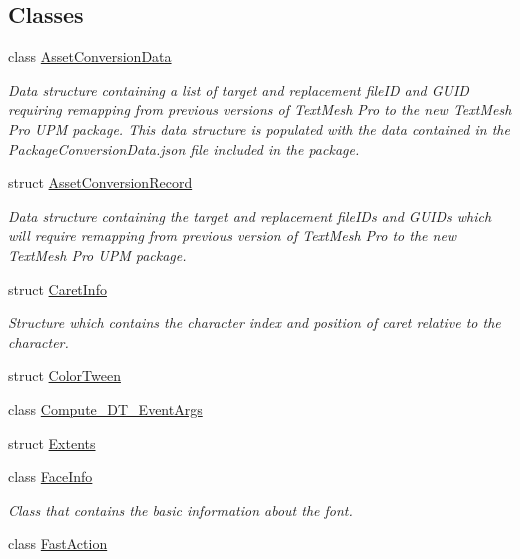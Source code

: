 \subsection*{Classes}
\begin{DoxyCompactItemize}
\item 
class \mbox{\hyperlink{class_t_m_pro_1_1_asset_conversion_data}{Asset\+Conversion\+Data}}
\begin{DoxyCompactList}\small\item\em Data structure containing a list of target and replacement file\+ID and G\+U\+ID requiring remapping from previous versions of Text\+Mesh Pro to the new Text\+Mesh Pro U\+PM package. This data structure is populated with the data contained in the Package\+Conversion\+Data.\+json file included in the package. \end{DoxyCompactList}\item 
struct \mbox{\hyperlink{struct_t_m_pro_1_1_asset_conversion_record}{Asset\+Conversion\+Record}}
\begin{DoxyCompactList}\small\item\em Data structure containing the target and replacement file\+I\+Ds and G\+U\+I\+Ds which will require remapping from previous version of Text\+Mesh Pro to the new Text\+Mesh Pro U\+PM package. \end{DoxyCompactList}\item 
struct \mbox{\hyperlink{struct_t_m_pro_1_1_caret_info}{Caret\+Info}}
\begin{DoxyCompactList}\small\item\em Structure which contains the character index and position of caret relative to the character. \end{DoxyCompactList}\item 
struct \mbox{\hyperlink{struct_t_m_pro_1_1_color_tween}{Color\+Tween}}
\item 
class \mbox{\hyperlink{class_t_m_pro_1_1_compute___d_t___event_args}{Compute\+\_\+\+D\+T\+\_\+\+Event\+Args}}
\item 
struct \mbox{\hyperlink{struct_t_m_pro_1_1_extents}{Extents}}
\item 
class \mbox{\hyperlink{class_t_m_pro_1_1_face_info}{Face\+Info}}
\begin{DoxyCompactList}\small\item\em Class that contains the basic information about the font. \end{DoxyCompactList}\item 
class \mbox{\hyperlink{class_t_m_pro_1_1_fast_action}{Fast\+Action}}

\end{DoxyCompactItemize}
